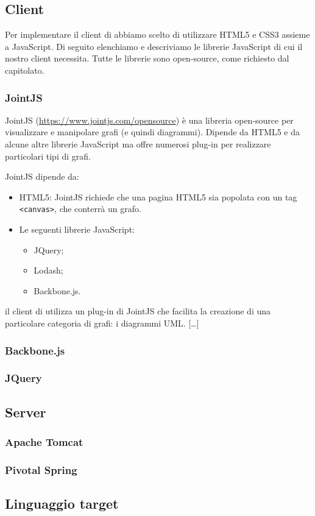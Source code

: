 


\subsection{Client}
Per implementare il client di \proj{} abbiamo scelto di utilizzare HTML5 e CSS3 assieme a JavaScript. Di seguito elenchiamo e descriviamo le librerie JavaScript di cui il nostro client necessita. Tutte le librerie sono open-source, come richiesto dal capitolato.

\subsubsection{JointJS}
JointJS (\url{https://www.jointjs.com/opensource}) è una libreria open-source per visualizzare e manipolare grafi (e quindi diagrammi). Dipende da HTML5 e da alcune altre librerie JavaScript ma offre numerosi plug-in per realizzare particolari tipi di grafi.

JointJS dipende da:
\begin{itemize}
	\item HTML5: JointJS richiede che una pagina HTML5 sia popolata con un tag \texttt{<canvas>}, che conterrà un grafo.
	\item Le seguenti librerie JavaScript:
	\begin{itemize}
		\item JQuery;
		\item Lodash;
		\item Backbone.js.
	\end{itemize}
\end{itemize}

il client di \proj{} utilizza un plug-in di JointJS che facilita la creazione di una particolare categoria di grafi: i diagrammi UML. [\dots]

\subsubsection{Backbone.js}

\subsubsection{JQuery}




\subsection{Server}

\subsubsection{Apache Tomcat}

\subsubsection{Pivotal Spring}




\subsection{Linguaggio target}

